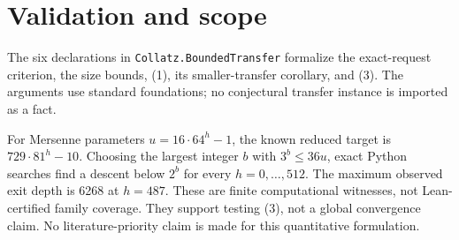 \documentclass[10pt]{article}
\begin{document}
\section{Validation and scope}
The six declarations in \texttt{Collatz.BoundedTransfer} formalize the exact-request criterion, the size bounds, (1), its smaller-transfer corollary, and (3). The arguments use standard foundations; no conjectural transfer instance is imported as a fact.

For Mersenne parameters $u=16\cdot64^h-1$, the known reduced target is $729\cdot81^h-10$. Choosing the largest integer $b$ with $3^b\le36u$, exact Python searches find a descent below $2^b$ for every $h=0,\ldots,512$. The maximum observed exit depth is 6268 at $h=487$. These are finite computational witnesses, not Lean-certified family coverage. They support testing (3), not a global convergence claim. No literature-priority claim is made for this quantitative formulation.
\end{document}
